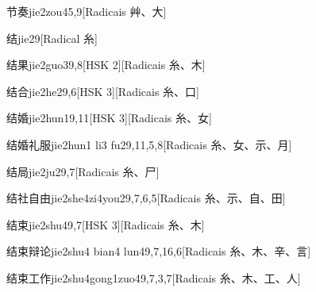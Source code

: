 \begin{entry}{节奏}{jie2zou4}{5,9}[Radicais ⾋、⼤]
\end{entry}

\begin{entry}{结}{jie2}{9}[Radical ⽷]
\end{entry}

\begin{entry}{结果}{jie2guo3}{9,8}[HSK 2][Radicais ⽷、⽊]
\end{entry}

\begin{entry}{结合}{jie2he2}{9,6}[HSK 3][Radicais ⽷、⼝]
\end{entry}

\begin{entry}{结婚}{jie2hun1}{9,11}[HSK 3][Radicais ⽷、⼥]
\end{entry}

\begin{entry}{结婚礼服}{jie2hun1 li3 fu2}{9,11,5,8}[Radicais ⽷、⼥、⽰、⽉]
\end{entry}

\begin{entry}{结局}{jie2ju2}{9,7}[Radicais ⽷、⼫]
\end{entry}

\begin{entry}{结社自由}{jie2she4zi4you2}{9,7,6,5}[Radicais ⽷、⽰、⾃、⽥]
\end{entry}

\begin{entry}{结束}{jie2shu4}{9,7}[HSK 3][Radicais ⽷、⽊]
\end{entry}

\begin{entry}{结束辩论}{jie2shu4 bian4 lun4}{9,7,16,6}[Radicais ⽷、⽊、⾟、⾔]
\end{entry}

\begin{entry}{结束工作}{jie2shu4gong1zuo4}{9,7,3,7}[Radicais ⽷、⽊、⼯、⼈]
\end{entry}


